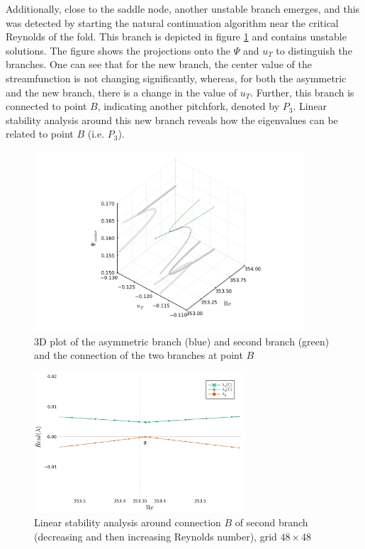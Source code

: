 Additionally, close to the saddle node, another unstable branch emerges, and
this was detected by starting the natural continuation algorithm near the
critical Reynolds of the fold. This branch is depicted in figure
\ref{fig:branch2} and contains unstable solutions. The figure shows the
projections onto the $\Psi$ and $u_T$ to distinguish the branches. One can see
that for the new branch, the center value of the streamfunction is not changing
significantly, whereas, for both the asymmetric and the new branch, there is a
change in the value of $u_T$. Further, this branch is connected to point $B$,
indicating another pitchfork, denoted by $P_3$. Linear stability analysis
around this new branch reveals how the eigenvalues can be related to point $B$
(i.e. $P_3$). 

\clearpage

\begin{figure}[h]
  \centering
  \includegraphics[width=0.9\textwidth]{figs/branch2_64x64.png}
  \caption{3D plot of the asymmetric branch (blue) and second branch (green) and the
    connection of the two branches at point $B$}
  \label{fig:branch2}
\end{figure}

\begin{figure}[h!]
  \centering
  \includegraphics[width=0.7\textwidth]{figs/lsa_sn_branch2_zoom48x48.png}
  \caption{Linear stability analysis around connection $B$ of second branch
  (decreasing and then increasing Reynolds number), grid $48 \times 48$}
  \label{fig:lsa_branch2}
\end{figure}

